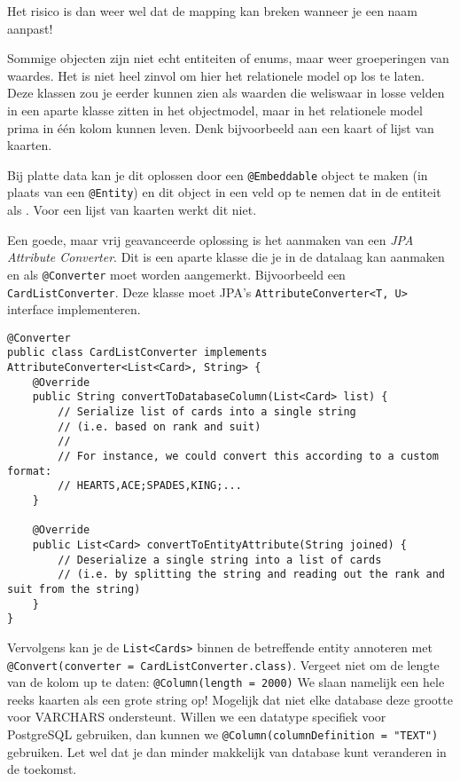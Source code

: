\documentclass[dutch,a4paper,12pt,doubleside]{book}
\begin{document}
Het risico is dan weer wel dat de 
mapping kan breken wanneer je een naam aanpast!

Sommige objecten zijn niet echt entiteiten of enums, maar weer 
groeperingen van waardes. Het is niet heel zinvol om hier 
het relationele model op los te laten. Deze klassen zou je 
eerder kunnen zien als waarden die weliswaar in losse velden 
in een aparte klasse zitten in het objectmodel, maar in het 
relationele model prima in één kolom kunnen leven.
Denk bijvoorbeeld aan een kaart of lijst van kaarten.

Bij platte data kan je dit oplossen door een 
\texttt{@Embeddable} object te maken (in plaats van een 
\texttt{@Entity}) en dit object in een  
veld op te nemen dat in de entiteit als .
Voor een lijst van kaarten werkt dit niet.

Een goede, maar vrij geavanceerde oplossing is het aanmaken 
van een \textit{JPA Attribute Converter}. Dit is een aparte 
klasse die je in de datalaag kan aanmaken en als \texttt{@Converter}
moet worden aangemerkt. Bijvoorbeeld een \texttt{CardListConverter}.
Deze klasse moet JPA's \texttt{AttributeConverter<T, U>}
interface implementeren.

\begin{verbatim}
@Converter
public class CardListConverter implements AttributeConverter<List<Card>, String> {
    @Override
    public String convertToDatabaseColumn(List<Card> list) {
        // Serialize list of cards into a single string 
        // (i.e. based on rank and suit)
        //
        // For instance, we could convert this according to a custom format: 
        // HEARTS,ACE;SPADES,KING;...
    }

    @Override
    public List<Card> convertToEntityAttribute(String joined) {
        // Deserialize a single string into a list of cards
        // (i.e. by splitting the string and reading out the rank and suit from the string)
    }
}
\end{verbatim}

Vervolgens kan je de \texttt{List<Cards>} binnen de betreffende entity
annoteren met \texttt{@Convert(converter = CardListConverter.class)}.
Vergeet niet om de lengte van de kolom up te daten:
\texttt{@Column(length = 2000)}
We slaan namelijk een hele reeks kaarten als een grote string op!
Mogelijk dat niet elke database deze grootte voor VARCHARS ondersteunt.
Willen we een datatype specifiek voor PostgreSQL gebruiken,
dan kunnen we \texttt{@Column(columnDefinition = "TEXT")}
gebruiken. Let wel dat je dan minder makkelijk van database kunt veranderen
in de toekomst.
\end{document}
